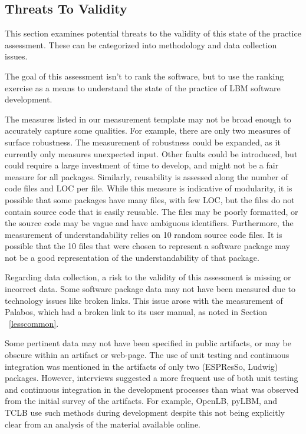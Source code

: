 \documentclass[final, 3p, times, authoryear]{elsarticle}
\begin{document}
\subsection{Threats To Validity} \label{threats}

This section examines potential threats to the validity of this state of the
practice assessment. These can be categorized into methodology and data
collection issues. 

The goal of this assessment isn't to rank the software, but to use the ranking
exercise as a means to understand the state of the practice of LBM software
development.

The measures listed in our measurement template may not be broad enough to
accurately capture some qualities. For example, there are only two measures of
surface robustness. The measurement of robustness could be expanded, as it
currently only measures unexpected input. Other faults could be introduced, but
could require a large investment of time to develop, and might not be a fair
measure for all packages. Similarly, reusability is assessed along the number of
code files and LOC per file. While this measure is indicative of modularity, it
is possible that some packages have many files, with few LOC, but the files do
not contain source code that is easily reusable. The files may be poorly
formatted, or the source code may be vague and have ambiguous identifiers.
Furthermore, the measurement of understandability relies on 10 random source
code files. It is possible that the 10 files that were chosen to represent a
software package may not be a good representation of the understandability of
that package.

Regarding data collection, a risk to the validity of this assessment is missing
or incorrect data. Some software package data may not have been measured due to
technology issues like broken links. This issue arose with the measurement of
Palabos, which had a broken link to its user manual, as noted in Section
~\ref{lesscommon}. 

Some pertinent data may not have been specified in public artifacts, or may be
obscure within an artifact or web-page. The use of unit testing and continuous
integration was mentioned in the artifacts of only two (ESPResSo, Ludwig)
packages. However, interviews suggested a more frequent use of both unit testing
and continuous integration in the development processes than what was observed
from the initial survey of the artifacts. For example, OpenLB, pyLBM, and TCLB
use such methods during development despite this not being explicitly clear from
an analysis of the material available online. 
\end{document}
